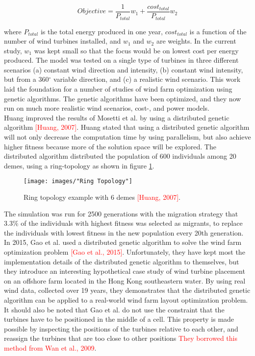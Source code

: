 \begin{equation}
Objective = \frac{1}{P_{total}}w_1 + \frac{cost_{total}}{P_{total}}w_2
\label{Objective function Mosetti et al.}
\end{equation}

where $P_{total}$ is the total energy produced in one year, $cost_{total}$ is a function of the number of wind turbines installed, and $w_1$ and $w_2$ are weights. In the current study, $w_1$ was kept small so that the focus would be on lowest cost per energy produced. The model was tested on a single type of turbines in three different scenarios (a) constant wind direction and intensity, (b) constant wind intensity, but from a 360$^{\circ}$ variable direction, and (c) a realistic wind scenario. This work laid the foundation for a number of studies of wind farm optimization using genetic algorithms. The genetic algorithms have been optimized, and they now run on much more realistic wind scenarios, cost-, and power models.\\

\noindent Huang improved the results of Mosetti et al. by using a distributed genetic algorithm \textcolor{red}{[Huang, 2007]}. Huang stated that using a distributed genetic algorithm will not only decrease the computation time by using parallelism, but also achieve higher fitness because more of the solution space will be explored. The distributed algorithm distributed the population of 600 individuals among 20 demes, using a ring-topology as shown in figure \ref{Ring Topology}.

\begin{figure}[h!]
\begin{center}
\texttt{[image: images/"Ring Topology"]}
\caption{Ring topology example with 6 demes \textcolor{red}{[Huang, 2007]}.}
\label{Ring Topology}
\end{center}
\end{figure}


The simulation was run for 2500 generations with the migration strategy that 3.3\% of the individuals with highest fitness was selected as migrants, to replace the individuals with lowest fitness in the new population every 20th generation. \\

\noindent In 2015, Gao et al. used a distributed genetic algorithm to solve the wind farm optimization problem \textcolor{red}{[Gao et al., 2015]}. Unfortunately, they have kept most the implementation details of the distributed genetic algorithm to themselves, but they introduce an interesting hypothetical case study of wind turbine placement on an offshore farm located in the Hong Kong southeastern water. By using real wind data, collected over 19 years, they demonstrates that the distributed genetic algorithm can be applied to a real-world wind farm layout optimization problem. It should also be noted that Gao et al. do not use the constraint that the turbines have to be positioned in the middle of a cell. This property is made possible by inspecting the positions of the turbines relative to each other, and reassign the turbines that are too close to other positions \textcolor{red}{They borrowed this method from Wan et al., 2009}.\\

